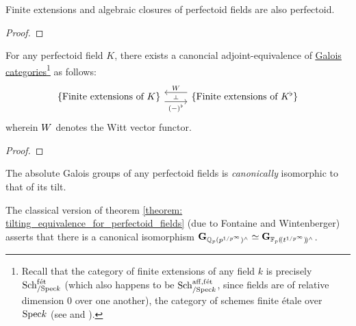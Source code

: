                 \begin{lemma}
                    Finite extensions and algebraic closures of perfectoid fields are also perfectoid.  
                \end{lemma}
                    \begin{proof}
                        
                    \end{proof}
                \begin{theorem} \label{theorem: tilting_equivalence_for_perfectoid_fields}
                    For any perfectoid field $K$, there exists a canoncial adjoint-equivalence of \href{https://stacks.math.columbia.edu/tag/0BMQ}{\underline{Galois categories}}\footnote{Recall that the category of finite extensions of any field $k$ is precisely $\mathrm{Sch}_{/\mathrm{Spec} k}^{\mathrm{f\acute{e}t}}$ (which also happens to be $\mathrm{Sch}_{/\mathrm{Spec} k}^{\mathrm{aff}, \mathrm{f\acute{e}t}}$, since fields are of relative dimension $0$ over one another), the category of schemes finite \'etale over $\mathrm{Spec} k$ (see \cite[\href{https://stacks.math.columbia.edu/tag/0BL6}{Tag 0BL6}]{stacks} and \cite[\href{https://stacks.math.columbia.edu/tag/00U3}{Tag 00U3}]{stacks}).} as follows:
                        $$
                            \begin{tikzcd}
                            	{\{\text{Finite extensions of $K$}\}} & {\{\text{Finite extensions of $K^{\flat}$}\}}
                            	\arrow[""{name=0, anchor=center, inner sep=0}, "{(-)^{\flat}}"', shift right=2, from=1-1, to=1-2]
                            	\arrow[""{name=1, anchor=center, inner sep=0}, "\Witt"', shift right=2, from=1-2, to=1-1]
                            	\arrow["\dashv"{anchor=center, rotate=-90}, draw=none, from=1, to=0]
                            \end{tikzcd}
                        $$
                    wherein $W$ denotes the Witt vector functor.
                \end{theorem}
                    \begin{proof}
                        
                    \end{proof}
                \begin{corollary}
                    The absolute Galois groups of any perfectoid fields is \textit{canonically} isomorphic to that of its tilt.
                \end{corollary}
                \begin{example}
                    The classical version of theorem \ref{theorem: tilting_equivalence_for_perfectoid_fields} (due to Fontaine and Wintenberger) asserts that there is a canonical isomorphism $\mathbf{G}_{ \mathbb{Q}_p(p^{1/p^{\infty}})^{\wedge} } \simeq \mathbf{G}_{ \mathbb{F}_p(\!(t^{1/p^{\infty}})\!)^{\wedge} }$.
                \end{example}
                
